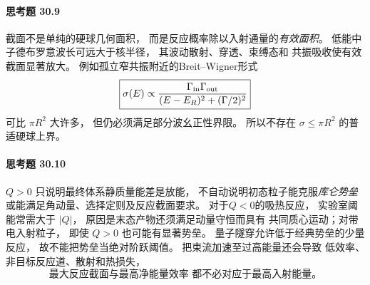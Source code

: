 \paragraph{思考题 30.9}
截面不是单纯的硬球几何面积，
而是反应概率除以入射通量的\emph{有效面积}。
低能中子德布罗意波长可远大于核半径，
其波动散射、穿透、束缚态和
共振吸收使有效截面显著放大。
例如孤立窄共振附近的Breit--Wigner形式
\[
\boxed{\sigma(E)\propto\frac{\Gamma_{\rm in}
\Gamma_{\rm out}}{(E-E_R)^2+(\Gamma/2)^2}}
\]
可比 \(\pi R^2\) 大许多，
但仍必须满足部分波幺正性界限。
所以不存在
\(\sigma\le\pi R^2\) 的普适硬球上界。

\paragraph{思考题 30.10}
\(Q>0\) 只说明最终体系静质量能差是放能，
不自动说明初态粒子能克服\emph{库仑势垒}
或能满足角动量、选择定则及反应截面要求。
对于\(Q<0\)的吸热反应，
实验室阈能常需大于 \(|Q|\)，
原因是末态产物还须满足动量守恒而具有
共同质心运动；对带电入射粒子，
即使 \(Q>0\) 也可能有显著势垒。
量子隧穿允许低于经典势垒的少量反应，
故不能把势垒当绝对阶跃阈值。
把束流加速至过高能量还会导致
低效率、非目标反应道、散射和热损失，
\[
\boxed{\text{最大反应截面与最高净能量效率
都不必对应于最高入射能量。}}
\]

